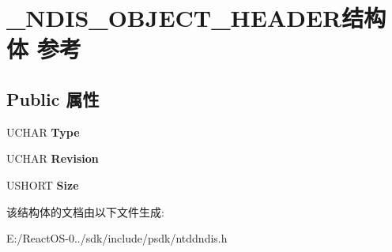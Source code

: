 \hypertarget{struct___n_d_i_s___o_b_j_e_c_t___h_e_a_d_e_r}{}\section{\+\_\+\+N\+D\+I\+S\+\_\+\+O\+B\+J\+E\+C\+T\+\_\+\+H\+E\+A\+D\+E\+R结构体 参考}
\label{struct___n_d_i_s___o_b_j_e_c_t___h_e_a_d_e_r}
\subsection*{Public 属性}
\begin{DoxyCompactItemize}
\item 
\mbox{\label{struct___n_d_i_s___o_b_j_e_c_t___h_e_a_d_e_r_a94248fe227c238358866b025d6780330}} 
U\+C\+H\+AR {\bfseries Type}
\item 
\mbox{\label{struct___n_d_i_s___o_b_j_e_c_t___h_e_a_d_e_r_a113eedd80230f71c123d88fea271bb12}} 
U\+C\+H\+AR {\bfseries Revision}
\item 
\mbox{\label{struct___n_d_i_s___o_b_j_e_c_t___h_e_a_d_e_r_a709380afb516bc50ba7dfcd613ab9df9}} 
U\+S\+H\+O\+RT {\bfseries Size}
\end{DoxyCompactItemize}


该结构体的文档由以下文件生成\+:\begin{DoxyCompactItemize}
\item 
E\+:/\+React\+O\+S-\/0../sdk/include/psdk/ntddndis.\+h\end{DoxyCompactItemize}
